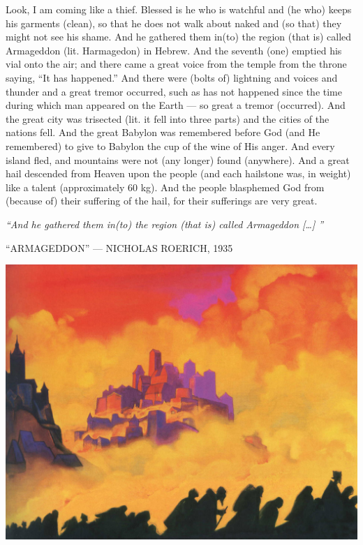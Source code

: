 \begin{pages}
\begin{Leftside}
		Look, I am coming like a thief. Blessed is he who is watchful and (he who) keeps his garments (clean), so that he does not walk about naked and (so that) they might not see his shame. And he gathered them in(to) the region (that is) called Armageddon (lit. Harmagedon) in Hebrew. 
		\pend
		\pstart
		And the seventh (one) emptied his vial onto the air; and there came a great voice from the temple from the throne saying, “It has happened.” And there were (bolts of) lightning and voices and thunder and a great tremor occurred, such as has not happened since the time during which man appeared on the Earth — so great a tremor (occurred). 
		\pend
		\pstart
		And the great city was trisected (lit. it fell into three parts) and the cities of the nations fell. And the great Babylon was remembered before God (and He remembered) to give to Babylon the cup of the wine of His anger. And every island fled, and mountains were not (any longer) found (anywhere). 
		\pend
		\pstart
		And a great hail descended from Heaven upon the people (and each hailstone was, in weight) like a talent (approximately 60 kg). And the people blasphemed God from (because of) their suffering of the hail, for their sufferings are very great. 
		\pend
        \endnumbering
    \end{Leftside}

\end{pages} 
\Pages

\clearpage
\thispagestyle{empty}
\null\vfill
\settowidth{}
\begin{center}
\parbox{\longest}{%
  \raggedright{\huge\itshape%
    ``And he gathered them in(to) the region (that is) called Armageddon […] '' \par\bigskip
  }
  \raggedleft\Large\MakeUppercase{``Armageddon'' — Nicholas Roerich, 1935}\par%
}
\vfill\vfill
\clearpage\newpage
\end{center}
\newpage
\thispagestyle{empty}
\begin{center}
	\includegraphics[angle=90, width=1\textwidth]{images/illustrations/roericharmageddon}
\end{center}